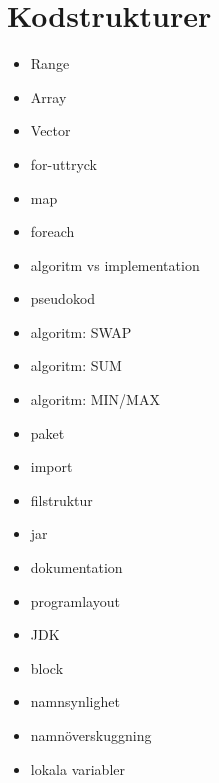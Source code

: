 \chapter{Kodstrukturer}\label{chapter:W02}
\begin{itemize}[nosep]
\item Range
\item Array
\item Vector
\item for-uttryck
\item map
\item foreach
\item algoritm vs implementation
\item pseudokod
\item algoritm: SWAP
\item algoritm: SUM
\item algoritm: MIN/MAX
\item paket
\item import
\item filstruktur
\item jar
\item dokumentation
\item programlayout
\item JDK
\item block
\item namnsynlighet
\item namnöverskuggning
\item lokala variabler
\end{itemize}